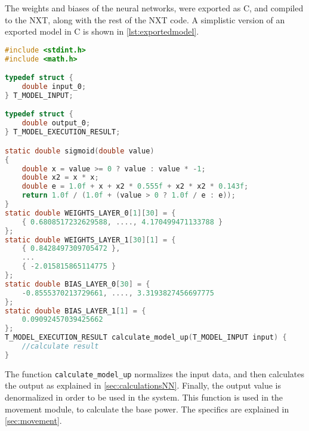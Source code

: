 
The weights and biases of the neural networks, were exported as C, and compiled to the NXT, along with the rest of the NXT code.
A simplistic version of an exported model in C is shown in \autoref{lst:exportedmodel}.


\begin{lstlisting}[language=C,label={lst:exportedmodel},firstnumber={1},caption={Autogenerated model for getting power to move up}]
#include <stdint.h>
#include <math.h>

typedef struct {
	double input_0;
} T_MODEL_INPUT;

typedef struct {
	double output_0;
} T_MODEL_EXECUTION_RESULT;

static double sigmoid(double value)
{
	double x = value >= 0 ? value : value * -1;
	double x2 = x * x;
	double e = 1.0f + x + x2 * 0.555f + x2 * x2 * 0.143f;
	return 1.0f / (1.0f + (value > 0 ? 1.0f / e : e));
}
static double WEIGHTS_LAYER_0[1][30] = {
	{ 0.6808517232629588, ...., 4.170499471133788 }
};
static double WEIGHTS_LAYER_1[30][1] = {
	{ 0.8428497309705472 },
	...
	{ -2.015815865114775 }
};
static double BIAS_LAYER_0[30] = {
	-0.8555370213729661, ...., 3.3193827456697775
};
static double BIAS_LAYER_1[1] = {
	0.09092457039425662
};
T_MODEL_EXECUTION_RESULT calculate_model_up(T_MODEL_INPUT input) {
	//calculate result
}

\end{lstlisting}

The function \texttt{calculate\_model\_up} normalizes the input data, and then calculates the output as explained in \autoref{sec:calculationsNN}.
Finally, the output value is denormalized in order to be used in the system.
This function is used in the movement module, to calculate the base power.
The specifics are explained in \autoref{sec:movement}.

